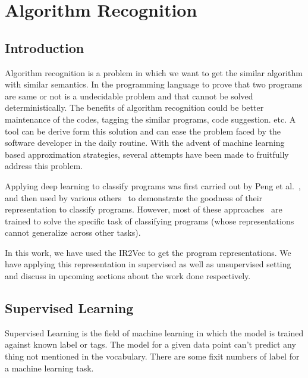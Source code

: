 \chapter{Algorithm Recognition}
\label{chap:ch3}

\section{Introduction}
Algorithm recognition is a problem in which we want to get the similar algorithm with similar semantics. In the programming language to prove that two programs are same or not is a undecidable problem and that cannot be solved deterministically. The benefits of algorithm recognition could be better maintenance of the codes, tagging the similar programs, code suggestion. etc.   A tool can be derive form this solution and can ease the problem faced by the software developer in the daily routine. With the advent of machine learning based approximation strategies, several attempts have been made to fruitfully address this problem.


Applying deep learning to classify programs was first carried out by Peng et al.~\cite{Peng:2015}, and then used by various others~\cite{tbcnn-aaai16,ncc,Chen:2019} to demonstrate the goodness of their representation to classify programs. 
However, most of these approaches~\cite{Peng:2015,tbcnn-aaai16,Chen:2019} are trained to solve the specific task of classifying programs (whose representations cannot generalize across other tasks).

In this work, we have used the IR2Vec to get the program representations. We have applying this representation in supervised as well as unsupervised setting and discuss in upcoming sections about the work done respectively.

\section{Supervised Learning}
Supervised Learning is the field of machine learning in which the model is trained against known label or tags. The model for a given data point can't predict any thing not mentioned in the vocabulary. There are some fixit numbers of label for a machine learning task.

